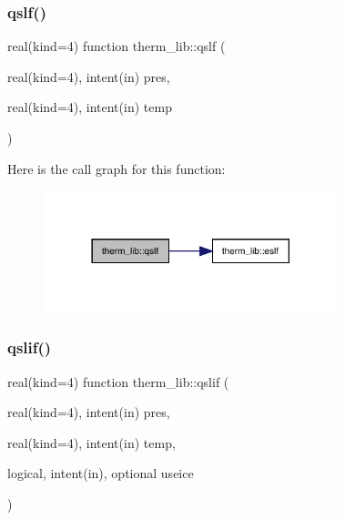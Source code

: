 \subsubsection{\texorpdfstring{qslf()}{qslf()}}
{\footnotesize\ttfamily real(kind=4) function therm\+\_\+lib\+::qslf (\begin{DoxyParamCaption}\item[{real(kind=4), intent(in)}]{pres,  }\item[{real(kind=4), intent(in)}]{temp }\end{DoxyParamCaption})}

Here is the call graph for this function\+:
\nopagebreak
\begin{figure}[H]
\begin{center}
\leavevmode
\includegraphics[width=242pt]{namespacetherm__lib_a383a9c98cdc308ddc74f774336a68c70_cgraph}
\end{center}
\end{figure}
\mbox{\label{namespacetherm__lib_a44ab3a68e6060bf4afbfc504e3a8c633}} 
\subsubsection{\texorpdfstring{qslif()}{qslif()}}
{\footnotesize\ttfamily real(kind=4) function therm\+\_\+lib\+::qslif (\begin{DoxyParamCaption}\item[{real(kind=4), intent(in)}]{pres,  }\item[{real(kind=4), intent(in)}]{temp,  }\item[{logical, intent(in), optional}]{useice }\end{DoxyParamCaption})}

